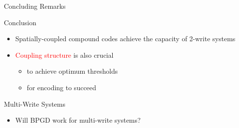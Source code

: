 \documentclass[10pt]{beamer}
\begin{document}
\begin{frame}{Concluding Remarks}
  \begin{block}{Conclusion}
    \begin{itemize}
    \item Spatially-coupled compound codes achieve the capacity of 2-write systems \vspace{0.2cm}
    \item \textcolor{red}{Coupling structure} is also crucial 
      \begin{itemize}
      \item to achieve optimum thresholds  
      \item for encoding to succeed 
      \end{itemize}
    \end{itemize}
  \end{block}
  \begin{block}{Multi-Write Systems}
    \begin{itemize}
    \item Will BPGD work for multi-write systems?
    \end{itemize}
  \end{block}
\end{frame}
\end{document}
